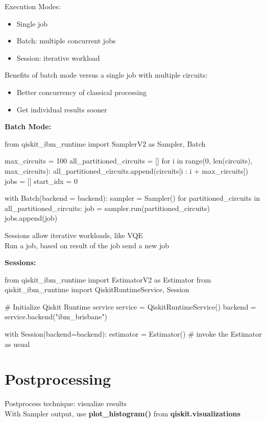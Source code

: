 \documentclass{article}
\newcommand{\ms}{\medskip}
\begin{document}
Execution Modes:
\begin{itemize}
    \item Single job
    \item Batch: multiple concurrent jobs
    \item Session: iterative workload
\end{itemize}\ms

Benefits of batch mode versus a single job with multiple circuits:
\begin{itemize}
    \item Better concurrency of classical processing
    \item Get individual results sooner
\end{itemize}\ms

\textbf{Batch Mode:}
\begin{python}
from qiskit_ibm_runtime import SamplerV2 as Sampler, Batch

max_circuits = 100
all_partitioned_circuits = []
for i in range(0, len(circuits), max_circuits):
    all_partitioned_circuits.append(circuits[i : i + max_circuits])
jobs = []
start_idx = 0

with Batch(backend = backend):
    sampler = Sampler()
        for partitioned_circuits in all_partitioned_circuits:
            job = sampler.run(partitioned_circuits)
            jobs.append(job)
\end{python}\ms

Sessions allow iterative workloads, like VQE\\
Run a job, based on result of the job send a new job\ms

\textbf{Sessions:}
\begin{python}
from qiskit_ibm_runtime import EstimatorV2 as Estimator
from qiskit_ibm_runtime import QiskitRuntimeService, Session

# Initialize Qiskit Runtime service
service = QiskitRuntimeService()
backend = service.backend("ibm_brisbane")

with Session(backend=backend):
    estimator = Estimator()
    # invoke the Estimator as usual
\end{python}\ms

\section*{Postprocessing}
\label{s:postprocess}

Postprocess technique: visualize results\\
With Sampler output, use \textbf{plot\_histogram()} from \textbf{qiskit.visualizations}\ms
\end{document}
